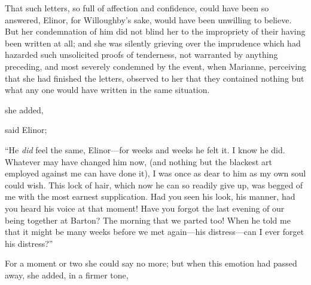 
That such letters, so full of affection and confidence, could have been so answered, Elinor, for Willoughby's sake, would have been unwilling to believe. But her condemnation of him did not blind her to the impropriety of their having been written at all; and she was silently grieving over the imprudence which had hazarded such unsolicited proofs of tenderness, not warranted by anything preceding, and most severely condemned by the event, when Marianne, perceiving that she had finished the letters, observed to her that they contained nothing but what any one would have written in the same situation.

 she added, 

 said Elinor; 

“He {\em did} feel the same, Elinor---for weeks and weeks he felt it. I know he did. Whatever may have changed him now, (and nothing but the blackest art employed against me can have done it), I was once as dear to him as my own soul could wish. This lock of hair, which now he can so readily give up, was begged of me with the most earnest supplication. Had you seen his look, his manner, had you heard his voice at that moment! Have you forgot the last evening of our being together at Barton? The morning that we parted too! When he told me that it might be many weeks before we met again---his distress---can I ever forget his distress?”

For a moment or two she could say no more; but when this emotion had passed away, she added, in a firmer tone,




